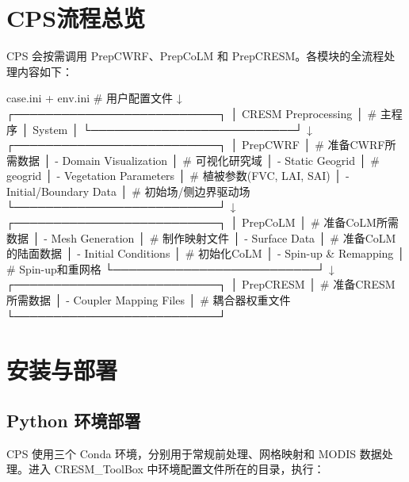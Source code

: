 \documentclass[UTF8,a4paper,11pt,fontset=none]{ctexart}
\begin{document}
\newpage

\section{CPS流程总览}

CPS 会按需调用 PrepCWRF、PrepCoLM 和 PrepCRESM。各模块的全流程处理内容如下：

\begin{CPSCode} [leftmargin=4em,commandchars=\\\{\}]

            case.ini + env.ini                # 用户配置文件
                     ↓
        ┌──────────────────────────┐
        │  CRESM Preprocessing     │          # 主程序
        │        System            │
        └──────────────────────────┘
                     ↓
        ┌──────────────────────────┐
        │  PrepCWRF                │          # 准备CWRF所需数据
        │  - Domain Visualization  │          # 可视化研究域
        │  - Static Geogrid        │          # geogrid
        │  - Vegetation Parameters │          # 植被参数(FVC, LAI, SAI)
        │  - Initial/Boundary Data │          # 初始场/侧边界驱动场
        └──────────────────────────┘
                     ↓
        ┌──────────────────────────┐
        │  PrepCoLM                │          # 准备CoLM所需数据
        │  - Mesh Generation       │          # 制作映射文件
        │  - Surface Data          │          # 准备CoLM的陆面数据
        │  - Initial Conditions    │          # 初始化CoLM
        │  - Spin-up & Remapping   │          # Spin-up和重网格
        └──────────────────────────┘
                     ↓
        ┌──────────────────────────┐
        │  PrepCRESM               │          # 准备CRESM所需数据
        │  - Coupler Mapping Files │          # 耦合器权重文件
        └──────────────────────────┘

\end{CPSCode}

\newpage

\section{安装与部署}

\subsection{Python 环境部署}

CPS 使用三个 Conda 环境，分别用于常规前处理、网格映射和 MODIS 数据处理。进入 CRESM\_ToolBox 中环境配置文件所在的目录，执行：
\end{document}
